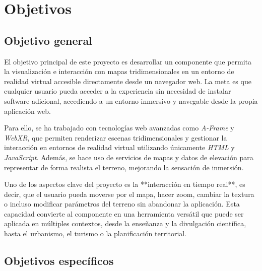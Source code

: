 \documentclass[a4paper, 12pt]{book}
\begin{document}
\cleardoublepage %
\chapter{Objetivos} %
\label{chap:objetivos} %

\section{Objetivo general} %
\label{sec:objetivo-general} %



El objetivo principal de este proyecto es desarrollar un componente que permita la visualización e interacción con mapas tridimensionales en un entorno de realidad virtual accesible directamente desde un navegador web. La meta es que cualquier usuario pueda acceder a la experiencia sin necesidad de instalar software adicional, accediendo a un entorno inmersivo y navegable desde la propia aplicación web.

Para ello, se ha trabajado con tecnologías web avanzadas como \textit{A-Frame} y \textit{WebXR}, que permiten renderizar escenas tridimensionales y gestionar la interacción en entornos de realidad virtual utilizando únicamente \textit{HTML} y \textit{JavaScript}. Además, se hace uso de servicios de mapas y datos de elevación para representar de forma realista el terreno, mejorando la sensación de inmersión.

Uno de los aspectos clave del proyecto es la **interacción en tiempo real**, es decir, que el usuario pueda moverse por el mapa, hacer zoom, cambiar la textura o incluso modificar parámetros del terreno sin abandonar la aplicación. Esta capacidad convierte al componente en una herramienta versátil que puede ser aplicada en múltiples contextos, desde la enseñanza y la divulgación científica, hasta el urbanismo, el turismo o la planificación territorial.


\section{Objetivos específicos}
\label{sec:objetivos-especificos}
\end{document}
